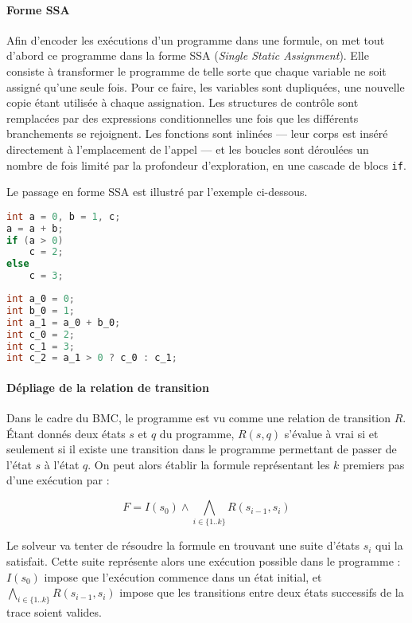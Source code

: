 \paragraph{Forme SSA}
Afin d'encoder les exécutions d'un programme dans une
formule, on met tout d'abord ce programme dans la forme SSA (\emph{Single Static
Assignment}). Elle consiste à transformer le programme de telle sorte que chaque
variable ne soit assigné qu'une seule fois. Pour ce faire, les variables sont
dupliquées, une nouvelle copie étant utilisée à chaque assignation. Les
structures de contrôle sont remplacées par des expressions conditionnelles une
fois que les différents branchements se rejoignent. Les fonctions sont inlinées
--- leur corps est inséré directement à l'emplacement de l'appel --- et les
boucles sont déroulées un nombre de fois limité par la profondeur d'exploration,
en une cascade de blocs \lstinline!if!.

Le passage en forme SSA est illustré par l'exemple ci-dessous.

\noindent\begin{minipage}{.45\textwidth}
\begin{lstlisting}[language=C, caption=Code initial, frame=tlrb]
int a = 0, b = 1, c;
a = a + b;
if (a > 0)
    c = 2;
else
    c = 3;
\end{lstlisting}
\end{minipage}\hfill
\begin{minipage}{.45\textwidth}
\begin{lstlisting}[language=C, caption=Forme SSA,frame=tlrb]
int a_0 = 0;
int b_0 = 1;
int a_1 = a_0 + b_0;
int c_0 = 2;
int c_1 = 3;
int c_2 = a_1 > 0 ? c_0 : c_1;
\end{lstlisting}
\end{minipage}

\paragraph{Dépliage de la relation de transition}
Dans le cadre du BMC, le programme est vu comme une relation de transition
\(R\). Étant donnés deux états \(s\) et \(q\) du programme, \(R(s, q)\) s'évalue
à vrai si et seulement si il existe une transition dans le programme permettant
de passer de l'état \(s\) à l'état \(q\). On peut alors établir la formule
représentant les \(k\) premiers pas d'une exécution par :

\[
F = I(s_0) \land \bigwedge_{i\in \{1..k\}} R(s_{i-1}, s_i)
\]

Le solveur va tenter de résoudre la formule en trouvant une suite d'états
\(s_i\) qui la satisfait. Cette suite représente alors une exécution possible
dans le programme : \(I(s_0)\) impose que l'exécution commence dans un état
initial, et \(\bigwedge_{i\in \{1..k\}} R(s_{i-1}, s_i)\) impose que les
transitions entre deux états successifs de la trace soient valides.

